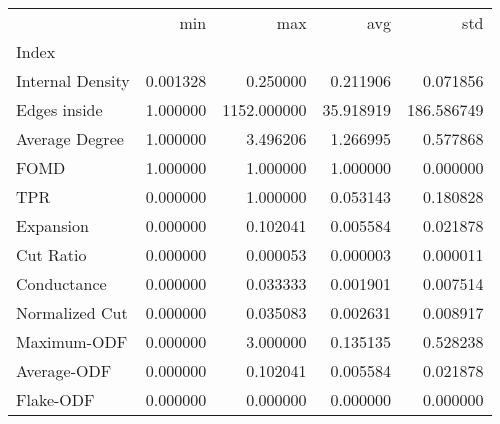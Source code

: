 \begin{tabular}{lrrrr}
\toprule
{} &       min &          max &        avg &         std \\
Index            &           &              &            &             \\
\midrule
Internal Density &  0.001328 &     0.250000 &   0.211906 &    0.071856 \\
Edges inside     &  1.000000 &  1152.000000 &  35.918919 &  186.586749 \\
Average Degree   &  1.000000 &     3.496206 &   1.266995 &    0.577868 \\
FOMD             &  1.000000 &     1.000000 &   1.000000 &    0.000000 \\
TPR              &  0.000000 &     1.000000 &   0.053143 &    0.180828 \\
Expansion        &  0.000000 &     0.102041 &   0.005584 &    0.021878 \\
Cut Ratio        &  0.000000 &     0.000053 &   0.000003 &    0.000011 \\
Conductance      &  0.000000 &     0.033333 &   0.001901 &    0.007514 \\
Normalized Cut   &  0.000000 &     0.035083 &   0.002631 &    0.008917 \\
Maximum-ODF      &  0.000000 &     3.000000 &   0.135135 &    0.528238 \\
Average-ODF      &  0.000000 &     0.102041 &   0.005584 &    0.021878 \\
Flake-ODF        &  0.000000 &     0.000000 &   0.000000 &    0.000000 \\
\bottomrule
\end{tabular}
